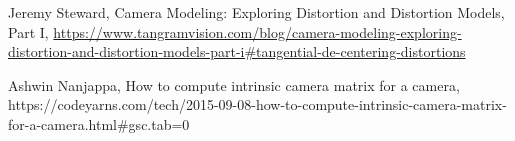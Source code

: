 \documentclass[11pt]{scrartcl}
\begin{document}
\begin{thebibliography}{9}
													Jeremy Steward, Camera Modeling: Exploring Distortion and Distortion Models, Part I, \url{https://www.tangramvision.com/blog/camera-modeling-exploring-distortion-and-distortion-models-part-i#tangential-de-centering-distortions}
													
													Ashwin Nanjappa, How to compute intrinsic camera matrix for a camera, \\
													https://codeyarns.com/tech/2015-09-08-how-to-compute-intrinsic-camera-matrix-for-a-camera.html#gsc.tab=0
													
													
													
													
													 
												\end{thebibliography}
												
\end{document}

